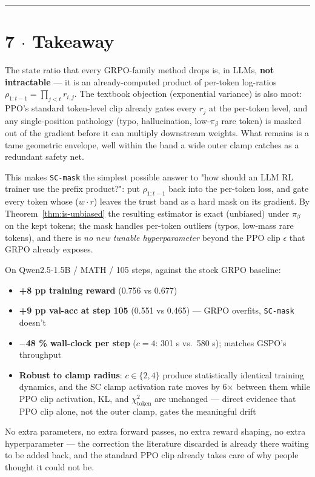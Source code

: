 \documentclass[11pt,a4paper]{article}
\theoremstyle{remark}
\begin{document}
\vspace{0.5em}\hrule\vspace{0.5em}
\section*{7 $\cdot$ Takeaway}

The state ratio that every GRPO-family method drops is, in LLMs, \textbf{not intractable} --- it is an already-computed product of per-token log-ratios $\rho_{1:t-1}=\prod_{j<t} r_{i,j}$. The textbook objection (exponential variance) is also moot: PPO's standard token-level clip already gates every $r_j$ at the per-token level, and any single-position pathology (typo, hallucination, low-$\pi_\beta$ rare token) is masked out of the gradient before it can multiply downstream weights. What remains is a tame geometric envelope, well within the band a wide outer clamp catches as a redundant safety net.

This makes \texttt{SC-mask} the simplest possible answer to "how should an LLM RL trainer use the prefix product?": put $\rho_{1:t-1}$ back into the per-token loss, and gate every token whose ($w\!\cdot\! r$) leaves the trust band as a hard mask on its gradient. By Theorem~\ref{thm:is-unbiased} the resulting estimator is exact (unbiased) under $\pi_\beta$ on the kept tokens; the mask handles per-token outliers (typos, low-mass rare tokens), and there is \emph{no new tunable hyperparameter} beyond the PPO clip $\epsilon$ that GRPO already exposes.

On Qwen2.5-1.5B / MATH / 105 steps, against the stock GRPO baseline:

\begin{itemize}[leftmargin=1.2em]
\item \textbf{+8 pp training reward} (0.756 vs 0.677)
\item \textbf{+9 pp val-acc at step 105} (0.551 vs 0.465) --- GRPO overfits, \texttt{SC-mask} doesn't
\item \textbf{$-$48 \% wall-clock per step} ($c{=}4$: 301 s vs.\ 580 s); matches GSPO's throughput
\item \textbf{Robust to clamp radius}: $c\!\in\!\{2,4\}$ produce statistically identical training dynamics, and the SC clamp activation rate moves by 6$\times$ between them while PPO clip activation, KL, and $\chi^2_{\mathrm{token}}$ are unchanged --- direct evidence that PPO clip alone, not the outer clamp, gates the meaningful drift
\end{itemize}

No extra parameters, no extra forward passes, no extra reward shaping, no extra hyperparameter --- the correction the literature discarded is already there waiting to be added back, and the standard PPO clip already takes care of why people thought it could not be.
\end{document}
